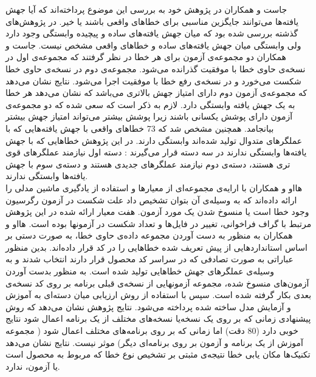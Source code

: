 جاست و همکاران در پژوهش خود به بررسی این موضوع پرداخته‌اند که آیا جهش یافته‌ها می‌توانند جایگزین مناسبی برای خطاهای واقعی باشند یا خیر\cite{just2014mutants}. در پژوهش‌های گذشته بررسی شده بود که میان جهش یافته‌های ساده و پیچیده وابستگی وجود دارد ولی وابستگی میان جهش یافته‌های ساده و خطاهای واقعی مشخص نیست. جاست و همکاران دو مجموعه‌ی آزمون برای هر خطا در نظر گرفتند که مجموعه‌ی اول در نسخه‌ی حاوی خطا با موفقیت گذرانده می‌شود. مجموعه‌ی دوم در نسخه‌ی حاوی خطا شکست می‌خورد و در نسخه‌ی رفع خطا با موفقیت اجرا می‌شود. نتایج نشان می‌دهد که مجموعه‌ی آزمون دوم دارای امتیاز جهش بالاتری می‌باشد که نشان می‌دهد هر خطا به یک جهش یافته وابستگی دارد. لازم به ذکر است که سعی شده که دو مجموعه‌ی آزمون دارای پوشش یکسانی باشند زیرا پوشش بیشتر می‌تواند امتیاز جهش بیشتر بیانجامد. همچنین مشخص شد که  
73 \lr{\%} 
 خطاهای واقعی با جهش یافته‌هایی که  با عملگرهای متدوال تولید شده‌اند وابستگی دارند. در این پژوهش خطاهایی که با جهش یافته‌ها وابستگی ندارند در سه دسته قرار می‌گیرند : دسته اول نیازمند عملگرهای قوی تری هستند، دسته‌ی دوم نیازمند عملگرهای جدیدی هستند و دسته‌ی سوم با جهش یافته‌ها وابستگی ندارند.\\
 
 هااو و همکاران با ارایه‌ی مجموعه‌ای از معیارها و استفاده از یادگیری ماشین مدلی را ارائه داده‌اند که به وسیله‌ی آن بتوان تشخیص داد علت شکست در آزمون رگرسیون وجود خطا است یا منسوخ  شدن یک مورد آزمون. هفت معیار ارائه شده در این پژوهش مرتبط با گراف فراخوانی، تغییر در فایل‌ها و تعداد شکست در آزمونها بوده است.  هااو و همکاران به منظور به دست آوردن مجموعه داده‌ی حاوی خطا، به صورت دستی بر اساس استانداردهایی  از پیش تعریف شده خطاهایی را در کد قرار داده‌اند. بدین منظور عباراتی به صورت تصادفی که در سراسر کد محصول قرار دارند انتخاب شدند و به وسیله‌ی عملگرهای جهش خطاهایی تولید شده است. به منظور بدست آوردن آزمون‌های منسوخ شده، مجموعه آزمونهایی از نسخه‌ی قبلی برنامه بر روی کد  نسخه‌ی بعدی بکار گرفته شده است. سپس با استفاده از روش ارزیابی میان دسته‌ای به آموزش و آزمایش مدل ساخته شده پرداخته می‌شود. نتایج پژوهش نشان می‌دهد که روش پیشنهادی زمانی که بر روی یک نسخه‌یا نسخه‌های مختلف از یک برنامه اعمال شود نتایج خوبی دارد (80\lr{\%} دقت) اما زمانی که بر روی برنامه‌های مختلف اعمال شود ( مجموعه آموزش از یک برنامه و آزمون بر روی برنامه‌ای دیگر) موثر نیست. نتایج نشان می‌دهد تکنیک‌ها مکان یابی خطا نتیجه‌ی مثبتی بر تشخیص نوع خطا که مربوط به محصول است یا آزمون، ندارد.\\
 
